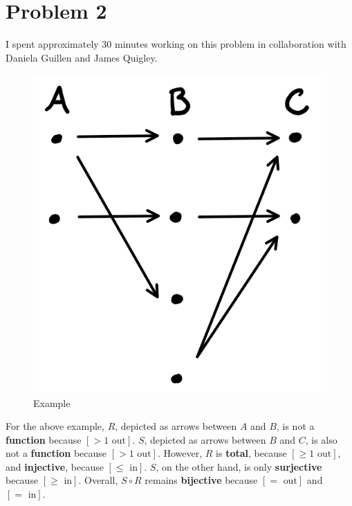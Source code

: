 \documentclass{article}
\begin{document}
\section*{Problem 2}

I spent approximately 30 minutes working on this problem in collaboration with
Daniela Guillen and James Quigley.

\begin{figure}[H]
  \centering
  \includegraphics[scale=0.60]{"Example"}
  \caption{Example}
\end{figure}

For the above example, $R$, depicted as arrows between $A$ and $B$, is not a
\textbf{function} because $[> 1 \textrm{ out}]$. $S$, depicted as arrows between
$B$ and $C$, is also not a \textbf{function} because $[> 1 \textrm{ out}]$.
However, $R$ is \textbf{total}, because $[\geq 1 \textrm{ out}]$, and
\textbf{injective}, because $[\leq \textrm{ in}]$. $S$, on the other hand, is
only \textbf{surjective} because $[\geq \textrm{ in}]$. Overall, $S \circ R$
remains \textbf{bijective} because $[= \textrm{ out}]$ and $[= \textrm{ in}]$.

\bigbreak
\bigbreak
\bigbreak
\bigbreak
\bigbreak
\bigbreak
\bigbreak
\bigbreak
\bigbreak
\bigbreak
\bigbreak
\bigbreak
\bigbreak
\bigbreak
\bigbreak
\bigbreak
\bigbreak
\bigbreak
\bigbreak
\bigbreak
\bigbreak
\end{document}
